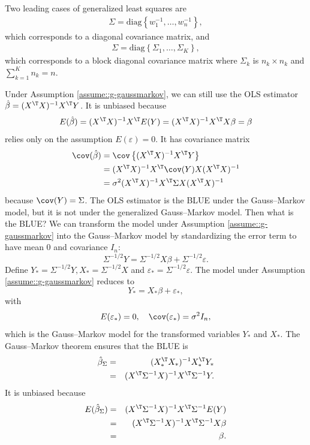 Two leading cases of generalized least squares are
\begin{eqnarray}
\label{eq::diagonal-sigma}
\Sigma=\text{diag}\left\{ w_{1}^{-1},\ldots,w_{n}^{-1}\right\} ,
\end{eqnarray}
which corresponds to  a diagonal
covariance matrix, and 
\begin{eqnarray}
\label{eq::block-diagonal-sigma}
\Sigma = \text{diag}\left\{ \Sigma_1,\ldots, \Sigma_K\right\} , 
\end{eqnarray}
which corresponds to a block diagonal covariance matrix where $\Sigma_k$ is $n_k\times n_k$ and $\sum_{k=1}^K n_k = n$. 

Under Assumption \ref{assume::g-gaussmarkov}, we can still use the OLS estimator $\hat{\beta}=(X^{\T}X)^{-1}X^{\T}Y$. It is unbiased because
$$
E(\hat{\beta}) = (X^{\T}X)^{-1}X^{\T}E(Y) = (X^{\T}X)^{-1}X^{\T} X\beta = \beta 
$$
relies only on the assumption $E(\varepsilon) = 0$. 
It has covariance matrix
\begin{align}
\cov(\hat{\beta}) & =\cov\left\{ (X^{\T}X)^{-1}X^{\T}Y\right\} \nonumber \\
 & =(X^{\T}X)^{-1}X^{\T}\cov(Y)X(X^{\T}X)^{-1}\nonumber \\
 & =\sigma^{2}(X^{\T}X)^{-1}X^{\T}\Sigma X(X^{\T}X)^{-1}\label{eq:cov-ols-generalmodel}
\end{align}
because $\cov(Y) = \Sigma$. 
The OLS estimator is the BLUE under the Gauss--Markov model, but it is
not under the generalized Gauss--Markov model. Then what is the BLUE? We can transform the model under Assumption \ref{assume::g-gaussmarkov} into the Gauss--Markov model by standardizing the error
term to have mean $0$ and covariance $I_n$:  
\[
\Sigma^{-1/2}Y=\Sigma^{-1/2}X\beta+\Sigma^{-1/2}\varepsilon.
\]
Define $Y_* =\Sigma^{-1/2}Y, X_*=\Sigma^{-1/2}X$ and $ \varepsilon_* =\Sigma^{-1/2}\varepsilon$.
The model under Assumption \ref{assume::g-gaussmarkov} reduces to 
\[
Y_* = X_* \beta+ \varepsilon_*,
\]
with
\[ 
E(\varepsilon_*) = 0, \quad \cov(\varepsilon_*) = \sigma^{2}I_{n},
\]
which is the Gauss--Markov model for the transformed variables  $Y_*$ and $X_*$. 
The Gauss--Markov theorem ensures that the BLUE is
\begin{eqnarray*}
\hat{\beta}_{\Sigma}
&=& ({X}_*^{\T}{X}_*)^{-1}{X}_*^{\T}{Y}_* \\
&=& (X^{\T}\Sigma^{-1}X)^{-1}X^{\T}\Sigma^{-1}Y . 
\end{eqnarray*}
It is unbiased because
\begin{eqnarray*}
E(\hat{\beta}_{\Sigma}) 
&=& (X^{\T}\Sigma^{-1}X)^{-1}X^{\T}\Sigma^{-1}E(Y) \\
&=& (X^{\T}\Sigma^{-1}X)^{-1}X^{\T}\Sigma^{-1}X\beta \\
&=&\beta . 
\end{eqnarray*}
